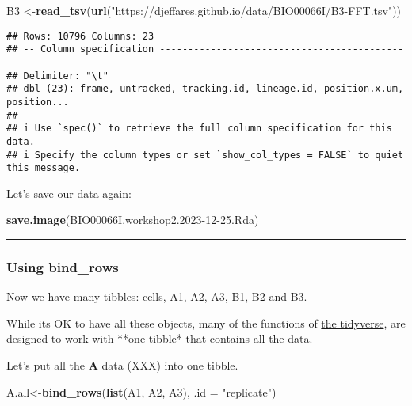 \documentclass[
]{article}
\newenvironment{Shaded}{\begin{snugshade}}{\end{snugshade}}
\newcommand{\AttributeTok}[1]{\textcolor[rgb]{0.13,0.29,0.53}{#1}}
\newcommand{\FunctionTok}[1]{\textcolor[rgb]{0.13,0.29,0.53}{\textbf{#1}}}
\newcommand{\NormalTok}[1]{#1}
\newcommand{\OtherTok}[1]{\textcolor[rgb]{0.56,0.35,0.01}{#1}}
\newcommand{\StringTok}[1]{\textcolor[rgb]{0.31,0.60,0.02}{#1}}
\begin{document}
\begin{Shaded}
\begin{Highlighting}[]
\NormalTok{B3 }\OtherTok{\textless{}{-}}\FunctionTok{read\_tsv}\NormalTok{(}\FunctionTok{url}\NormalTok{(}\StringTok{"https://djeffares.github.io/data/BIO00066I/B3{-}FFT.tsv"}\NormalTok{))}
\end{Highlighting}
\end{Shaded}

\begin{verbatim}
## Rows: 10796 Columns: 23
## -- Column specification --------------------------------------------------------
## Delimiter: "\t"
## dbl (23): frame, untracked, tracking.id, lineage.id, position.x.um, position...
## 
## i Use `spec()` to retrieve the full column specification for this data.
## i Specify the column types or set `show_col_types = FALSE` to quiet this message.
\end{verbatim}

Let's save our data again:

\begin{Shaded}
\begin{Highlighting}[]
\FunctionTok{save.image}\NormalTok{(}\StringTok{\textquotesingle{}BIO00066I.workshop2.2023{-}12{-}25.Rda\textquotesingle{}}\NormalTok{)}
\end{Highlighting}
\end{Shaded}

\begin{center}\rule{0.5\linewidth}{0.5pt}\end{center}

\hypertarget{using-bind_rows}{%
\subsubsection{Using bind\_rows}\label{using-bind_rows}}

Now we have many tibbles: cells, A1, A2, A3, B1, B2 and B3.

While its OK to have all these objects, many of the functions of
\href{https://www.tidyverse.org/}{the tidyverse}, are designed to work
with **one tibble* that contains all the data.

Let's put all the \textbf{A} data (XXX) into one tibble.

\begin{Shaded}
\begin{Highlighting}[]
\NormalTok{A.all}\OtherTok{\textless{}{-}}\FunctionTok{bind\_rows}\NormalTok{(}\FunctionTok{list}\NormalTok{(A1, A2, A3), }\AttributeTok{.id =} \StringTok{"replicate"}\NormalTok{)}
\end{Highlighting}
\end{Shaded}
\end{document}
